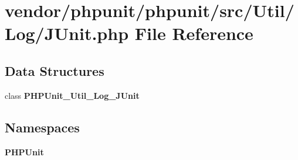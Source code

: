 \section{vendor/phpunit/phpunit/src/\+Util/\+Log/\+J\+Unit.php File Reference}
\label{_j_unit_8php}
\subsection*{Data Structures}
\begin{DoxyCompactItemize}
\item 
class {\bf P\+H\+P\+Unit\+\_\+\+Util\+\_\+\+Log\+\_\+\+J\+Unit}
\end{DoxyCompactItemize}
\subsection*{Namespaces}
\begin{DoxyCompactItemize}
\item 
 {\bf P\+H\+P\+Unit}
\end{DoxyCompactItemize}
